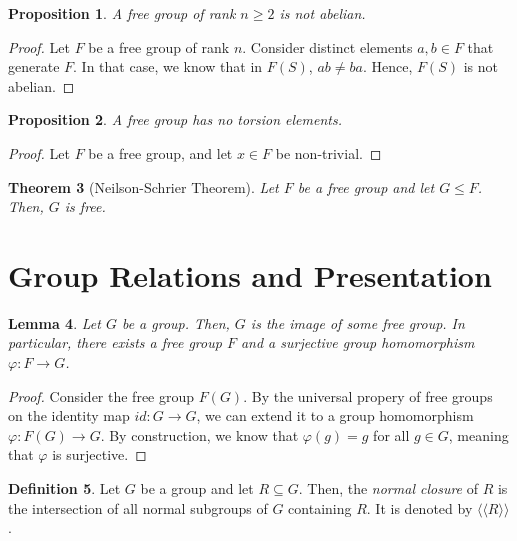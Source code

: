 \documentclass[a4paper, openany]{memoir}
\theoremstyle{definition}
\newtheorem{definition}{Definition}[section]
\theoremstyle{plain}
\newtheorem{theorem}[definition]{Theorem}
\newtheorem{lemma}[definition]{Lemma}
\newtheorem{proposition}[definition]{Proposition}
\begin{document}
    \begin{proposition}
        A free group of rank $n \geq 2$ is not abelian.
    \end{proposition}
    \begin{proof}
        Let $F$ be a free group of rank $n$. Consider distinct elements $a, b \in F$ that generate $F$. In that case, we know that in $F(S)$, $ab \neq ba$. Hence, $F(S)$ is not abelian.
    \end{proof}

    \begin{proposition}
        A free group has no torsion elements.
    \end{proposition}
    \begin{proof}
        Let $F$ be a free group, and let $x \in F$ be non-trivial.
    \end{proof}

    \begin{theorem}[Neilson-Schrier Theorem]
        Let $F$ be a free group and let $G \leq F$. Then, $G$ is free.
    \end{theorem}
    
    \newpage

    \section{Group Relations and Presentation}
    \begin{lemma}
        Let $G$ be a group. Then, $G$ is the image of some free group. In particular, there exists a free group $F$ and a surjective group homomorphism $\varphi \colon F \to G$.
    \end{lemma}
    \begin{proof}
        Consider the free group $F(G)$. By the universal propery of free groups on the identity map $id \colon G \to G$, we can extend it to a group homomorphism $\varphi \colon F(G) \to G$. By construction, we know that $\varphi(g) = g$ for all $g \in G$, meaning that $\varphi$ is surjective.
    \end{proof}

    \begin{definition}
        Let $G$ be a group and let $R \subseteq G$. Then, the \emph{normal closure} of $R$ is the intersection of all normal subgroups of $G$ containing $R$. It is denoted by $\langle \langle R \rangle \rangle$.
    \end{definition}
\end{document}

